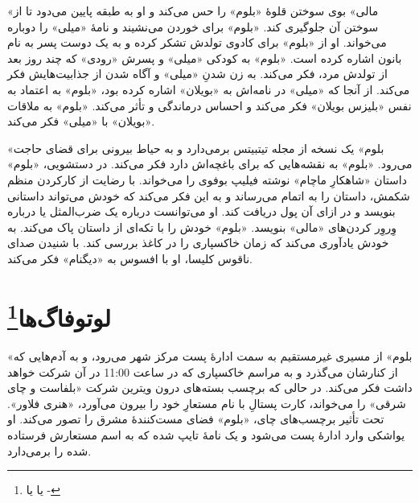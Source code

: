\documentclass[12pt]{book}
\newcommand{\noun}[1]{«{#1}»}
\begin{document}
    \noun{مالی} بوی سوختن قلوۀ \noun{بلوم} را حس می‌کند و او به طبقه پایین می‌دود تا از سوختن آن جلوگیری کند. \noun{بلوم} برای خوردن می‌نشیند و نامۀ \noun{میلی} را دوباره می‌خواند. او از \noun{بلوم} برای کادوی تولدش تشکر کرده و به یک دوست پسر به نام بانون اشاره کرده است. \noun{بلوم} به کودکی \noun{میلی} و پسرش \noun{رودی} که چند روز بعد از تولدش مرد، فکر می‌کند. به زن شدنِ \noun{میلی} و آگاه شدن از جذابیت‌هایش فکر می‌کند. از آنجا که \noun{میلی} در نامه‌اش به \noun{بویلان} اشاره کرده بود، \noun{بلوم} به اعتماد به نفس \noun{بلیزس بویلان‬} فکر می‌کند و احساس درماندگی و تأثر می‌کند. \noun{بلوم} به ملاقات \noun{بویلان} با \noun{میلی} فکر می‌کند.

    \noun{بلوم} یک نسخه از مجله تیتبیتس برمی‌دارد و به حیاط بیرونی برای قضای حاجت می‌رود. \noun{بلوم} به نقشه‌هایی که برای باغچه‌اش دارد فکر می‌کند. در دستشویی، \noun{بلوم} داستان «شاهکارِ ماچام» نوشته فیلیپ بوفوی را می‌خواند. با رضایت از کارکردن منظم شکمش، داستان را به اتمام می‌رساند و به این فکر می‌کند که خودش می‌تواند داستانی بنویسد و در ازای آن پول دریافت کند. او می‌توانست درباره یک ضرب‌المثل یا درباره وِروِر کردن‌های \noun{مالی} بنویسد. \noun{بلوم} خودش را با تکه‌ای از داستان پاک می‌کند. به خودش یادآوری می‌کند که زمان خاکسپاری را در کاغذ بررسی کند. با شنیدن صدای ناقوس کلیسا، او با افسوس به \noun{دیگنام} فکر می‌کند.

    \chapter[لوتوفاگ‌ها]{لوتوفاگ‌ها\protect\footnote{ یا  یا -}}\label{ep:5}
    \noun{بلوم} از مسیری غیرمستقیم به سمت ادارۀ پست مرکز شهر می‌رود، و به آدم‌هایی که از کنارشان می‌گذرد و به مراسم خاکسپاری که در ساعت 11:00 در آن شرکت خواهد داشت فکر می‌کند. در حالی که برچسب بسته‌های درون ویترین شرکت «بلفاست و چای شرقی» را می‌خواند، کارت پستالِ با نام مستعارِ خود را بیرون می‌آورد، \noun{هنری فلاور}. تحت تأثیر برچسب‌های چای، \noun{بلوم} فضای مست‌کنندۀ مشرق را تصور می‌کند. او یواشکی وارد ادارۀ پست می‌شود و یک نامۀ تایپ شده که به اسم مستعارش فرستاده شده را برمی‌دارد.
\end{document}
